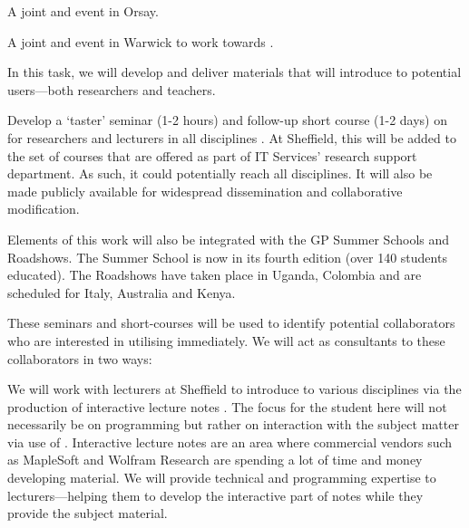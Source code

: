 \begin{workpackage}
\begin{tasklist}
\begin{task}[title=Community building: development workshops, lead=PS, id=devel-workshops]
\begin{compactitem}
\item A joint \Jupyter and \Sage event in Orsay.

\item A joint \LMFDB and \Sage event in Warwick to work towards
  .

\end{compactitem}


\end{task}

\begin{task}[title=Introduce \TheProject to researchers and teachers, id=project-intro]

In this task, we will develop and deliver materials that will
introduce \TheProject to potential users---both researchers and
teachers.

Develop a `taster' seminar (1-2 hours) and follow-up short course (1-2
days) on \TheProject for researchers and lecturers in all disciplines
. At Sheffield, this will be added to
the set of courses that are offered as part of IT Services' research
support department. As such, it could potentially reach all
disciplines. It will also be made publicly available for widespread
dissemination and collaborative modification.

Elements of this work will also be integrated with the GP Summer
Schools and Roadshows. The Summer School is now in its fourth edition
(over 140 students educated). The Roadshows have taken place in
Uganda, Colombia and are scheduled for Italy, Australia and Kenya.

These seminars and short-courses will be used to identify potential
collaborators who are interested in utilising \TheProject
immediately. We will act as consultants to these collaborators in two
ways:

We will work with lecturers at Sheffield to introduce \TheProject to
various disciplines via the production of interactive lecture
notes . The focus for the student here will not necessarily be on
programming but rather on interaction with the subject matter via use
of \TheProject. Interactive lecture notes are an area where commercial
vendors such as MapleSoft and Wolfram Research are spending a lot of
time and money developing material. We will provide technical and
programming expertise to lecturers---helping them to develop the
interactive part of notes while they provide the subject material.


\end{task}
\end{tasklist}
\end{workpackage}
